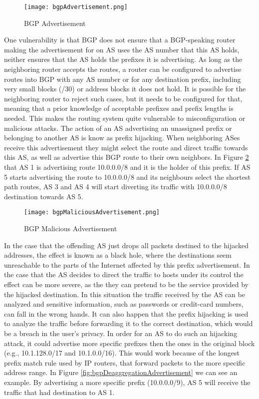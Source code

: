 \documentclass[11pt,a4paper]{scrreprt}
\begin{document}
\begin{figure}[!h]
\centering
\texttt{[image: bgpAdvertisement.png]}
\caption{BGP Advertisement}
\label{fig:bgpAdvertisement}
\end{figure}

One vulnerability is that BGP does not ensure that a BGP-speaking router making the advertisement for on AS uses the AS number that this AS holds, neither ensures that the AS holds the prefixes it is advertising. As long as the neighboring router accepts the routes, a router can be configured to advertise routes into BGP with any AS number or for any destination prefix, including very small blocks (/30) or address blocks it does not hold. It is possible for the neighboring router to reject such cases, but it needs to be configured for that, meaning that a prior knowledge of acceptable prefixes and prefix lengths is needed. This makes the routing system quite vulnerable to misconfiguration or malicious attacks. The action of an AS advertising an unassigned prefix or belonging to another AS is know as prefix hijacking. When neighboring ASes receive this advertisement they might select the route and direct traffic towards this AS, as well as advertise this BGP route to their own neighbors. In Figure \ref{fig:bgpMaliciousAdvertisement} that AS 1 is advertising route 10.0.0.0/8 and it is the holder of this prefix. If AS 5 starts advertising the route to 10.0.0.0/8 and its neighbours select the shortest path routes, AS 3 and AS 4 will start diverting its traffic with 10.0.0.0/8 destination towards AS 5.

\begin{figure}[!h]
\centering
\texttt{[image: bgpMaliciousAdvertisement.png]}
\caption{BGP Malicious Advertisement}
\label{fig:bgpMaliciousAdvertisement}
\end{figure}

In the case that the offending AS just drops all packets destined to the hijacked addresses, the effect is known as a black hole, where the destinations seem unreachable to the parts of the Internet affected by this prefix advertisement. In the case that the AS decides to direct the traffic to hosts under its control the effect can be more severe, as the they can pretend to be the service provided by the hijacked destination. In this situation the traffic received by the AS can be analyzed and sensitive information, such as passwords or credit-card numbers, can fall in the wrong hands. It can also happen that the prefix hijacking is used to analyze the traffic before forwarding it to the correct destination, which would be a breach in the user's privacy. In order for an AS to do such an hijacking attack, it could advertise more specific prefixes then the ones in the original block (e.g., 10.1.128.0/17 and 10.1.0.0/16). This would work because of the longest prefix match rule used by IP routers, that forward packets to the more specific address range. In Figure \ref{fig:bgpDeaggregationAdvertisement} we can see an example. By advertising a more specific prefix (10.0.0.0/9), AS 5 will receive the traffic that had destination to AS 1.
\end{document}
